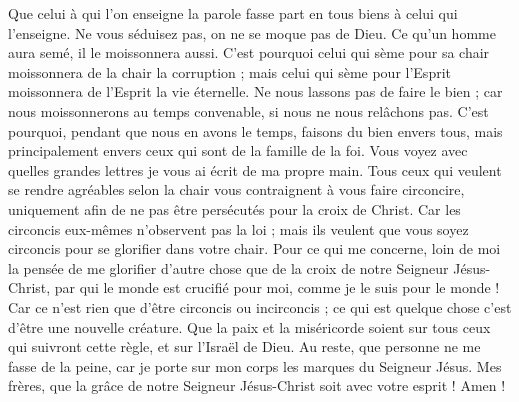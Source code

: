 \begin{multicols}{2}
Que celui à qui l’on enseigne la parole fasse part en tous biens à celui qui l'enseigne.
Ne vous séduisez pas, on ne se moque pas de Dieu. Ce qu’un homme aura semé, il le moissonnera aussi.
C'est pourquoi celui qui sème pour sa chair moissonnera de la chair la corruption ; mais celui qui sème pour l'Esprit moissonnera de l'Esprit la vie éternelle.
Ne nous lassons pas de faire le bien ; car nous moissonnerons au temps convenable, si nous ne nous relâchons pas.
C'est pourquoi, pendant que nous en avons le temps, faisons du bien envers tous, mais principalement envers ceux qui sont de la famille de la foi.
Vous voyez avec quelles grandes lettres je vous ai écrit de ma propre main.
Tous ceux qui veulent se rendre agréables selon la chair vous contraignent à vous faire circoncire, uniquement afin de ne pas être persécutés pour la croix de Christ.
Car les circoncis eux-mêmes n’observent pas la loi ; mais ils veulent que vous soyez circoncis pour se glorifier dans votre chair.
Pour ce qui me concerne, loin de moi la pensée de me glorifier d’autre chose que de la croix de notre Seigneur Jésus-Christ, par qui le monde est crucifié pour moi, comme je le suis pour le monde !
Car ce n’est rien que d’être circoncis ou incirconcis ; ce qui est quelque chose c’est d’être une nouvelle créature.
Que la paix et la miséricorde soient sur tous ceux qui suivront cette règle, et sur l'Israël de Dieu.
Au reste, que personne ne me fasse de la peine, car je porte sur mon corps les marques du Seigneur Jésus.
Mes frères, que la grâce de notre Seigneur Jésus-Christ soit avec votre esprit ! Amen !
\PPE{}
\end{multicols}
